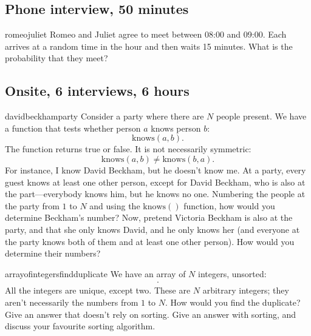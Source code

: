 \documentclass[a4paper]{article}
\begin{document}
\clearpage









\clearpage
\subsection{Phone interview,  50 minutes}
\begin{question}{romeojuliet}
Romeo and Juliet agree to meet between 08:00 and 09:00.
Each arrives at a random time in the hour and then waits 15 minutes.
What is the probability that they meet?
\end{question}

\clearpage



\clearpage
\subsection{Onsite, 6 interviews, 6 hours}
\begin{question}{davidbeckhamparty}
Consider a party where there are $N$ people present.
We have a function that tests whether person $a$ knows person $b$:
\[
  \text{knows}(a, b)
  \text{.}
\]
The function returns true or false.
It is not necessarily symmetric:
\[
  \text{knows}(a, b) \neq \text{knows}(b, a)
  \text{.}
\]
For instance, I know David Beckham, but he doesn't know me.
At a party, every guest knows at least one other person, except for David Beckham, who is also at the part---everybody knows him, but he knows no one.
Numbering the people at the party from $1$ to $N$ and using the
$\text{knows}()$
function, how would you determine Beckham's number?
Now, pretend Victoria Beckham is also at the party, and that she only knows David, and he only knows her (and everyone at the party knows both of them and at least one other person).
How would you determine their numbers?
\end{question}



\begin{question}{arrayofintegersfindduplicate}
We have an array of $N$ integers, unsorted:
\begin{align*}
  [n_1, n_2, \ldots , n_{N} ]
  \text{.}
\end{align*}
All the integers are unique, except two.
These are $N$ arbitrary integers; they aren't necessarily the numbers from $1$ to $N$.
How would you find the duplicate?
Give an answer that doesn't rely on sorting.
Give an answer with sorting, and discuss your favourite sorting algorithm.
\end{question}
\end{document}
